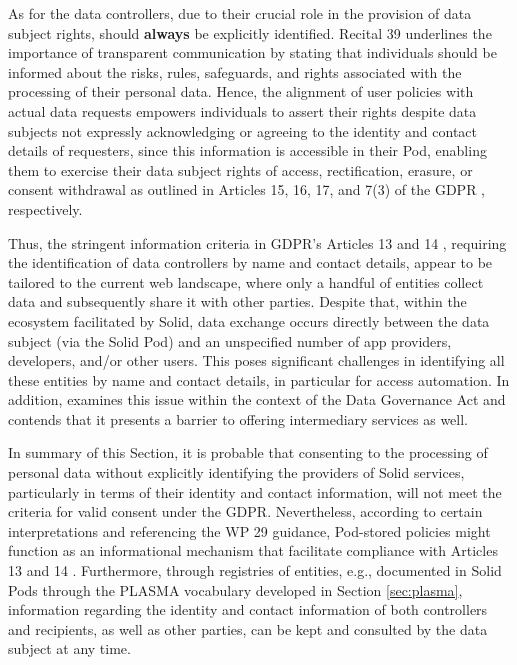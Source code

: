As for the data controllers, due to their crucial role in the provision of data subject rights, should \textbf{always} be explicitly identified.
Recital 39 \citeyearpar{noauthor_regulation_2016} underlines the importance of transparent communication by stating that individuals should be informed about the risks, rules, safeguards, and rights associated with the processing of their personal data.
Hence, the alignment of user policies with actual data requests empowers individuals to assert their rights despite data subjects not expressly acknowledging or agreeing to the identity and contact details of requesters, since this information is accessible in their Pod, enabling them to exercise their data subject rights of access, rectification, erasure, or consent withdrawal as outlined in Articles 15, 16, 17, and 7(3) of the GDPR \citeyearpar{noauthor_regulation_2016}, respectively.

Thus, the stringent information criteria in GDPR's Articles 13 and 14 \citeyearpar{noauthor_regulation_2016}, requiring the identification of data controllers by name and contact details, appear to be tailored to the current web landscape, where only a handful of entities collect data and subsequently share it with other parties.
Despite that, within the ecosystem facilitated by Solid, data exchange occurs directly between the data subject (via the Solid Pod) and an unspecified number of app providers, developers, and/or other users.
This poses significant challenges in identifying all these entities by name and contact details, in particular for access automation.
In addition, \cite{vogel_stretching_2022} examines this issue within the context of the Data Governance Act and contends that it presents a barrier to offering intermediary services as well.

In summary of this Section, it is probable that consenting to the processing of personal data without explicitly identifying the providers of Solid services, particularly in terms of their identity and contact information, will not meet the criteria for valid consent under the GDPR.
Nevertheless, according to certain interpretations and referencing the WP 29 guidance, Pod-stored policies might function as an informational mechanism that facilitate compliance with Articles 13 and 14 \citeyearpar{noauthor_regulation_2016}.
Furthermore, through registries of entities, e.g., documented in Solid Pods through the PLASMA vocabulary developed in Section \ref{sec:plasma}, information regarding the identity and contact information of both controllers and recipients, as well as other parties, can be kept and consulted by the data subject at any time.